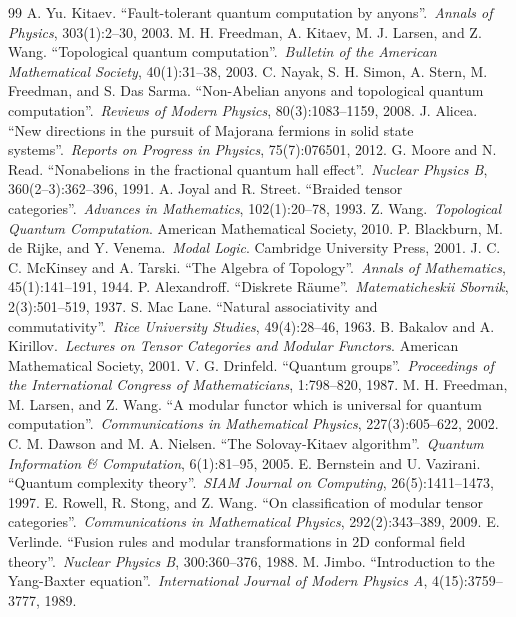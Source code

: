 \begin{thebibliography}{99}
 A. Yu. Kitaev. ``Fault-tolerant quantum computation by anyons''.\ \textit{Annals of Physics}, 303(1):2--30, 2003.
 M. H. Freedman, A. Kitaev, M. J. Larsen, and Z. Wang. ``Topological quantum computation''.\ \textit{Bulletin of the American Mathematical Society}, 40(1):31--38, 2003.
 C. Nayak, S. H. Simon, A. Stern, M. Freedman, and S. Das Sarma. ``Non-Abelian anyons and topological quantum computation''.\ \textit{Reviews of Modern Physics}, 80(3):1083--1159, 2008.
 J. Alicea. ``New directions in the pursuit of Majorana fermions in solid state systems''.\ \textit{Reports on Progress in Physics}, 75(7):076501, 2012.
 G. Moore and N. Read. ``Nonabelions in the fractional quantum hall effect''.\ \textit{Nuclear Physics B}, 360(2--3):362--396, 1991.
 A. Joyal and R. Street. ``Braided tensor categories''.\ \textit{Advances in Mathematics}, 102(1):20--78, 1993.
 Z. Wang.\ \textit{Topological Quantum Computation}. American Mathematical Society, 2010.
 P. Blackburn, M. de Rijke, and Y. Venema.\ \textit{Modal Logic}. Cambridge University Press, 2001.
 J. C. C. McKinsey and A. Tarski. ``The Algebra of Topology''.\ \textit{Annals of Mathematics}, 45(1):141--191, 1944.
 P. Alexandroff. ``Diskrete Räume''.\ \textit{Matematicheskii Sbornik}, 2(3):501--519, 1937.
 S. Mac Lane. ``Natural associativity and commutativity''.\ \textit{Rice University Studies}, 49(4):28--46, 1963.
 B. Bakalov and A. Kirillov.\ \textit{Lectures on Tensor Categories and Modular Functors}. American Mathematical Society, 2001.
 V. G. Drinfeld. ``Quantum groups''.\ \textit{Proceedings of the International Congress of Mathematicians}, 1:798--820, 1987.
 M. H. Freedman, M. Larsen, and Z. Wang. ``A modular functor which is universal for quantum computation''.\ \textit{Communications in Mathematical Physics}, 227(3):605--622, 2002.
 C. M. Dawson and M. A. Nielsen. ``The Solovay-Kitaev algorithm''.\ \textit{Quantum Information \& Computation}, 6(1):81--95, 2005.
 E. Bernstein and U. Vazirani. ``Quantum complexity theory''.\ \textit{SIAM Journal on Computing}, 26(5):1411--1473, 1997.
 E. Rowell, R. Stong, and Z. Wang. ``On classification of modular tensor categories''.\ \textit{Communications in Mathematical Physics}, 292(2):343--389, 2009.
 E. Verlinde. ``Fusion rules and modular transformations in 2D conformal field theory''.\ \textit{Nuclear Physics B}, 300:360--376, 1988.
 M. Jimbo. ``Introduction to the Yang-Baxter equation''.\ \textit{International Journal of Modern Physics A}, 4(15):3759--3777, 1989.
\end{thebibliography}
